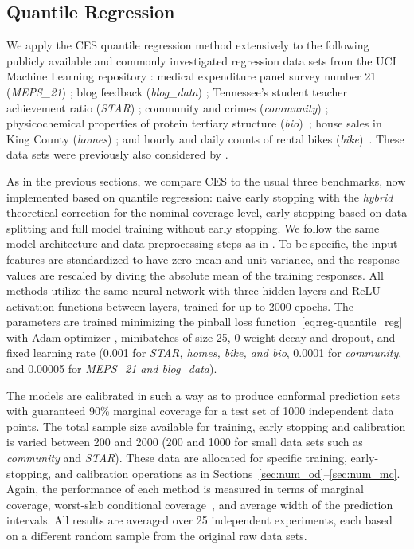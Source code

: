 \FloatBarrier

\subsection{Quantile Regression} \label{app:numerical-results-cqr}

We apply the CES quantile regression method extensively to the following publicly available and commonly investigated regression data sets from the UCI Machine Learning repository \cite{Pinar2012}: medical expenditure panel survey number 21 ({\em MEPS\_21}) \cite{meps_21}; blog feedback ({\em blog\_data}) \cite{blog_data}; Tennessee’s student teacher achievement ratio ({\em STAR}) \cite{star}; community and crimes ({\em community}) \cite{community}; physicochemical properties of protein tertiary structure ({\em bio})~\cite{data-bio}; house sales in King County ({\em homes}) \cite{homes}; and hourly and daily counts of rental bikes ({\em bike})~\cite{data-bike}. These data sets were previously also considered by \citet{romano2019conformalized}.

As in the previous sections, we compare CES to the usual three benchmarks, now implemented based on quantile regression: naive early stopping with the {\em hybrid} theoretical correction for the nominal coverage level, early stopping based on data splitting and full model training without early stopping. We follow the same model architecture and data preprocessing steps as in \citet{romano2019conformalized}. To be specific, the input features are standardized to have zero mean and unit variance, and the response values are rescaled by diving the absolute mean of the training responses. All methods utilize the same neural network with three hidden layers and ReLU activation functions between layers, trained for up to 2000 epochs. The parameters are trained minimizing the pinball loss function~\ref{eq:reg-quantile_reg} with Adam optimizer \cite{kingma2014adam}, minibatches of size 25, 0 weight decay and dropout, and fixed learning rate (0.001 for {\em STAR, homes, bike, and bio}, 0.0001 for {\em community}, and 0.00005 for {\em MEPS\_21 and blog\_data}). 

The models are calibrated in such a way as to produce conformal prediction sets with guaranteed 90\% marginal coverage for a test set of 1000 independent data points. The total sample size available for training, early stopping and calibration is varied between 200 and 2000 (200 and 1000 for small data sets such as {\em community} and {\em STAR}).
These data are allocated for specific training, early-stopping, and calibration operations as in Sections~\ref{sec:num_od}--\ref{sec:num_mc}.
Again, the performance of each method is measured in terms of marginal coverage, worst-slab conditional coverage~\cite{cauchois2020knowing}, and average width of the prediction intervals. All results are averaged over 25 independent experiments, each based on a different random sample from the original raw data sets.


